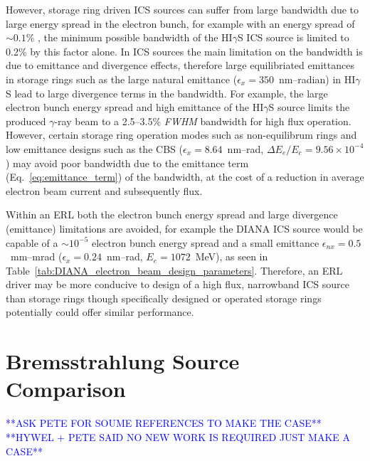 \documentclass[../main.tex]{subfiles}
\begin{document}
However, storage ring driven ICS sources can suffer from large bandwidth due to large energy spread in the electron bunch, for example with an energy spread of $\sim0.1$\% \cite{litvinenko1996intense}, the minimum possible bandwidth of the HI$\gamma$S ICS source is limited to 0.2\% by this factor alone. In ICS sources the main limitation on the bandwidth is due to emittance and divergence effects, therefore large equilibriated emittances in storage rings such as the large natural emittance ($\epsilon_{x} = 350$~\si{\nano\meter}--\si{radian}) in HI$\gamma$S \cite{weller2009research} lead to large divergence terms in the bandwidth. For example, the large electron bunch energy spread and high emittance of the HI$\gamma$S source limits the produced $\gamma$-ray beam to a 2.5--3.5\% \textit{FWHM} bandwidth \cite{weller2009research} for high flux operation. However, certain storage ring operation modes such as non-equilibrum rings \cite{huang1998laser,owen2013nonequilibrium} and low emittance designs such as the CBS \cite{pan2019design} ($\epsilon_{x} = 8.64$~\si{\nano\meter}--\si{\radian}, $\Delta E_{e}/E_{e} = 9.56\times 10^{-4}$) may avoid poor bandwidth due to the emittance term (Eq.~\ref{eq:emittance_term}) of the bandwidth, at the cost of a reduction in average electron beam current and subsequently flux.     

Within an ERL both the electron bunch energy spread and large divergence (emittance) limitations are avoided, for example the DIANA ICS source would be capable of a $\sim10^{-5}$ electron bunch energy spread and a small emittance $\epsilon_{nx} = 0.5$~\si{\milli\meter}--\si{\milli\radian} ($\epsilon_{x} = 0.24$~\si{\nano\meter}--\si{\radian}, $E_{e} = 1072$~\si{\mega\electronvolt}), as seen in Table~\ref{tab:DIANA_electron_beam_design_parameters}. Therefore, an ERL driver may be more conducive to design of a high flux, narrowband ICS source than storage rings though specifically designed or operated storage rings potentially could offer similar performance.

\section{Bremsstrahlung Source Comparison}
\label{sec:bremsstrahlung_comparison}

\textcolor{blue}{**ASK PETE FOR SOUME REFERENCES TO MAKE THE CASE** \\ **HYWEL + PETE SAID NO NEW WORK IS REQUIRED JUST MAKE A CASE**}
\end{document}
